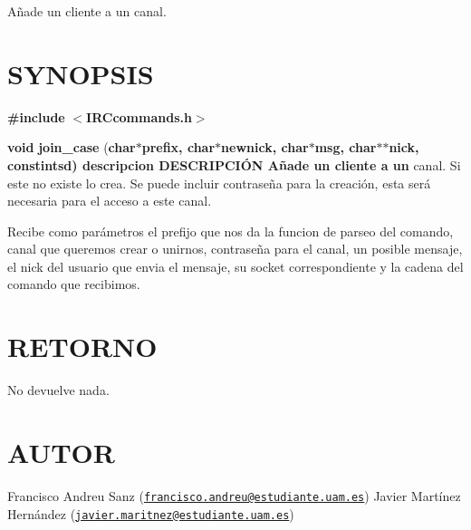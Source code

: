 Añade un cliente a un canal.\hypertarget{unknown_case_SYNOPSIS}{}\section{S\-Y\-N\-O\-P\-S\-I\-S}\label{unknown_case_SYNOPSIS}
{\bfseries \#include} {\bfseries $<$I\-R\-Ccommands.\-h$>$} 

{\bfseries void} {\bfseries join\-\_\-case} {\bfseries }({\bfseries char{\bfseries $\ast${\bfseries prefix{\bfseries },} {\bfseries char{\bfseries $\ast${\bfseries newnick{\bfseries },} {\bfseries char{\bfseries $\ast${\bfseries msg{\bfseries },} {\bfseries char{\bfseries $\ast$$\ast${\bfseries nick{\bfseries },} const{\bfseries int{\bfseries sd{\bfseries })}  } } descripcion} D\-E\-S\-C\-R\-I\-P\-C\-IÓ\-N}  Añade} un} cliente} a} un} canal. Si este no existe lo crea. Se puede incluir contraseña para la creación, esta será necesaria para el acceso a este canal.

Recibe como parámetros el prefijo que nos da la funcion de parseo del comando, canal que queremos crear o unirnos, contraseña para el canal, un posible mensaje, el nick del usuario que envia el mensaje, su socket correspondiente y la cadena del comando que recibimos.\hypertarget{unknown_case_retorno}{}\section{R\-E\-T\-O\-R\-N\-O}\label{unknown_case_retorno}
No devuelve nada.\hypertarget{unknown_case_authors}{}\section{A\-U\-T\-O\-R}\label{unknown_case_authors}
Francisco Andreu Sanz (\href{mailto:francisco.andreu@estudiante.uam.es}{\tt francisco.\-andreu@estudiante.\-uam.\-es}) Javier Martínez Hernández (\href{mailto:javier.maritnez@estudiante.uam.es}{\tt javier.\-maritnez@estudiante.\-uam.\-es}) 